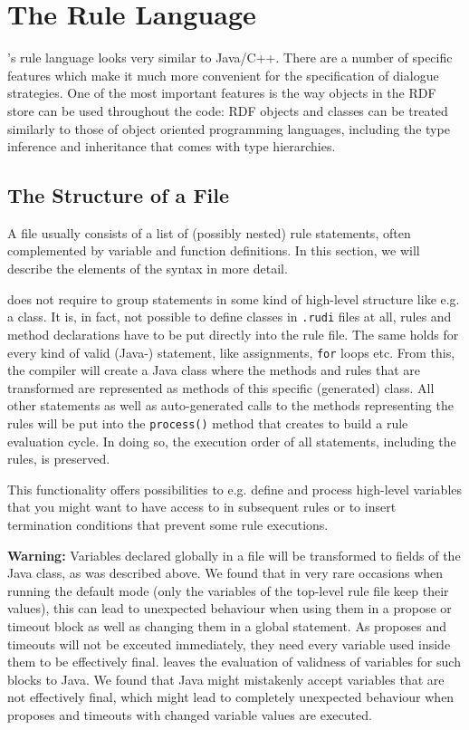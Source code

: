 \section{The \vonda Rule Language}
\label{sec:language}
\vonda's rule language looks very similar to Java/C++. There are a number of
specific features which make it much more convenient for the specification of
dialogue strategies. One of the most important features is the way objects in
the RDF store can be used throughout the code: RDF objects and classes can be
treated similarly to those of object oriented programming languages, including
the type inference and inheritance that comes with type hierarchies.

\subsection{The Structure of a \vonda File}

A \vonda file usually consists of a list of (possibly nested) rule statements,
often complemented by variable and function definitions. In this section, we
will describe the elements of the syntax in more detail.

\vonda does not require to group statements in some kind of high-level
structure like e.g. a class. It is, in fact, not possible to define classes in
\texttt{.rudi} files at all, rules and method declarations have to be put
directly into the rule file. The same holds for every kind of valid
(Java-) statement, like assignments, \texttt{for} loops etc. From this, the
compiler will create a Java class where the methods and rules that are
transformed are represented as methods of this specific (generated)
class. All other statements as well as auto-generated calls to the methods
representing the rules will be put into the \texttt{process()} method that
\vonda creates to build a rule evaluation cycle. In doing so, the execution
order of all statements, including the rules, is preserved.

This functionality offers possibilities to e.g. define and process high-level
variables that you might want to have access to in subsequent rules or to insert
termination conditions that prevent some rule executions.

\textbf{Warning:} Variables declared globally in a file will be transformed to
fields of the Java class, as was described above. We found that in very rare
occasions when running the default mode (only the variables of the top-level
rule file keep their values), this can lead to unexpected behaviour when using
them in a propose or timeout block as well as changing them in a global
statement. As proposes and timeouts will not be exceuted immediately, they need
every variable used inside them to be effectively final. \vonda leaves the
evaluation of validness of variables for such blocks to Java. We found that
Java might mistakenly accept variables that are not effectively final, which
might lead to completely unexpected behaviour when proposes and timeouts with
changed variable values are executed.

